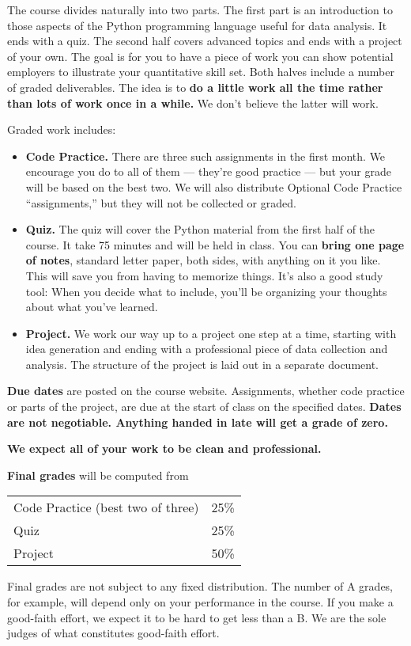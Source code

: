 \documentclass[11pt]{article}
\begin{document}
The course divides naturally into two parts.
The first part is an introduction to those aspects of the Python programming language
useful for data analysis. 
It ends with a quiz.  
The second half covers advanced topics and ends with a project of your own.  
The goal is for you to have a piece of work you can show potential employers to
illustrate your quantitative skill set.
Both halves include a number of graded deliverables.
The idea is to {\bf do a little work all the time rather than lots of work once in a while.}
We don't believe the latter will work.  

Graded work includes:
%
\begin{itemize}

\item {\bf Code Practice.\/}
There are three such assignments in the first month.
We encourage you do to all of them --- they're good practice ---
but your grade will be based on the best two.
We will also distribute Optional Code Practice ``assignments,''
but they will not be collected or graded.

\item {\bf Quiz.\/}
The quiz will cover the Python material from the first half of the course.
It take 75 minutes and will be held in class.
You can {\bf bring one page of notes\/}, standard letter paper,
both sides, with anything on it you like.
This will save you from having to memorize things.
It's also a good study tool:  When you decide what to include,
you'll be organizing your thoughts about what you've learned.

\item {\bf Project.\/}
We work our way up to a project one step at a time, starting with idea generation and ending
with a professional piece of data collection and analysis.
The structure of the project is laid out in a separate document.

\end{itemize}


{\bf Due dates} are posted on the course website.
Assignments, whether code practice or parts of the project,
are due at the start of class on the specified dates.
{\bf Dates are not negotiable.
Anything handed in late will get a grade of zero.\/}

{\bf We expect all of your work to be clean and professional.}


{\bf Final grades\/} will be computed from
\begin{center}
\begin{tabular}{ll}
Code Practice (best two of three) & 25\% \\
Quiz        & 25\% \\
Project     & 50\% \\
\end{tabular}
\end{center}
Final grades are not subject to any fixed distribution.
The number of A grades, for example,
will depend only on your performance in the course.
If you make a good-faith effort,
we expect it to be hard to get less than a B.
We are the sole judges of what constitutes good-faith effort.
\end{document}
